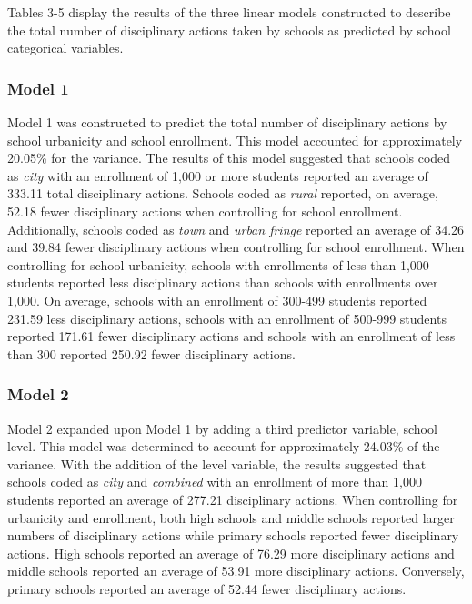 \documentclass[
  man, fleqn, noextraspace]{apa6}
\begin{document}
Tables 3-5 display the results of the three linear models constructed to describe the total number of disciplinary actions taken by schools as predicted by school categorical variables.

\hypertarget{model-1}{%
\subsubsection{Model 1}\label{model-1}}

Model 1 was constructed to predict the total number of disciplinary actions by school urbanicity and school enrollment. This model accounted for approximately 20.05\% for the variance. The results of this model suggested that schools coded as \emph{city} with an enrollment of 1,000 or more students reported an average of 333.11 total disciplinary actions. Schools coded as \emph{rural} reported, on average, 52.18 fewer disciplinary actions when controlling for school enrollment. Additionally, schools coded as \emph{town} and \emph{urban fringe} reported an average of 34.26 and 39.84 fewer disciplinary actions when controlling for school enrollment. When controlling for school urbanicity, schools with enrollments of less than 1,000 students reported less disciplinary actions than schools with enrollments over 1,000. On average, schools with an enrollment of 300-499 students reported 231.59 less disciplinary actions, schools with an enrollment of 500-999 students reported 171.61 fewer disciplinary actions and schools with an enrollment of less than 300 reported 250.92 fewer disciplinary actions.

\hypertarget{model-2}{%
\subsubsection{Model 2}\label{model-2}}

Model 2 expanded upon Model 1 by adding a third predictor variable, school level. This model was determined to account for approximately 24.03\% of the variance. With the addition of the level variable, the results suggested that schools coded as \emph{city} and \emph{combined} with an enrollment of more than 1,000 students reported an average of 277.21 disciplinary actions. When controlling for urbanicity and enrollment, both high schools and middle schools reported larger numbers of disciplinary actions while primary schools reported fewer disciplinary actions. High schools reported an average of 76.29 more disciplinary actions and middle schools reported an average of 53.91 more disciplinary actions. Conversely, primary schools reported an average of 52.44 fewer disciplinary actions.
\end{document}
